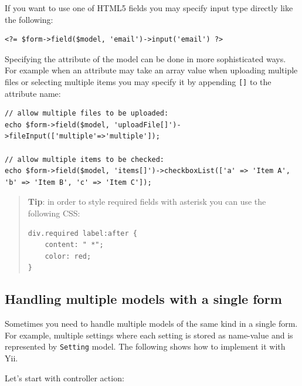 If you want to use one of HTML5 fields you may specify input type directly like the following:

\lstset{language=php}\begin{lstlisting}
<?= $form->field($model, 'email')->input('email') ?>
\end{lstlisting}
Specifying the attribute of the model can be done in more sophisticated ways. For example when an attribute may
take an array value when uploading multiple files or selecting multiple items you may specify it by appending \lstinline|[]|
to the attribute name:

\lstset{language=php}\begin{lstlisting}
// allow multiple files to be uploaded:
echo $form->field($model, 'uploadFile[]')->fileInput(['multiple'=>'multiple']);

// allow multiple items to be checked:
echo $form->field($model, 'items[]')->checkboxList(['a' => 'Item A', 'b' => 'Item B', 'c' => 'Item C']);
\end{lstlisting}
\begin{quote}\textbf{Tip}: in order to style required fields with asterisk you can use the following CSS:

\lstset{language=css}\begin{lstlisting}
div.required label:after {
    content: " *";
    color: red;
}
\end{lstlisting}
\end{quote}
\subsection{Handling multiple models with a single form}
Sometimes you need to handle multiple models of the same kind in a single form. For example, multiple settings where
each setting is stored as name-value and is represented by \lstinline|Setting| model. The
following shows how to implement it with Yii.

Let's start with controller action:

